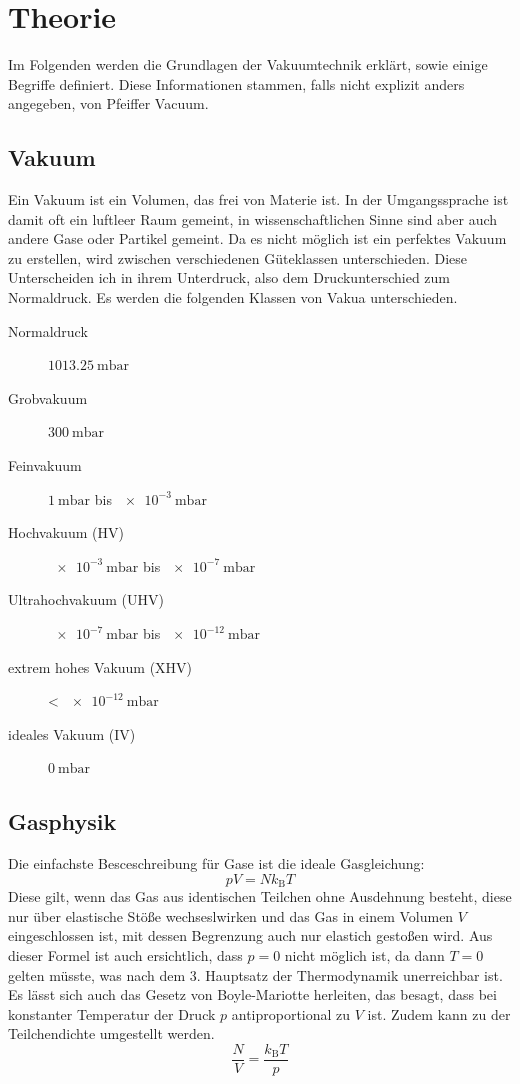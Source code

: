 \section{Theorie}
\label{sec:Theorie}
Im Folgenden werden die Grundlagen der Vakuumtechnik erklärt, sowie einige Begriffe definiert. Diese Informationen stammen, falls nicht explizit anders angegeben, von Pfeiffer Vacuum\cite{Pfeiffer}.
\subsection{Vakuum}
Ein Vakuum ist ein Volumen, das frei von Materie ist. In der Umgangssprache ist damit oft ein luftleer Raum gemeint, in wissenschaftlichen Sinne sind aber auch
andere Gase oder Partikel gemeint. Da es nicht möglich ist ein perfektes Vakuum zu erstellen, wird zwischen verschiedenen Güteklassen unterschieden. Diese
Unterscheiden ich in ihrem Unterdruck, also dem Druckunterschied zum Normaldruck. Es werden die folgenden Klassen von Vakua unterschieden.
\begin{description}
	\item[Normaldruck] $\SI{1013.25}{\milli \bar}$
	\item[Grobvakuum] $\SI{300}{\milli \bar}$
	\item[Feinvakuum] $\SI{1}{\milli \bar}$ bis $\SI{e-3}{\milli \bar}$
	\item[Hochvakuum (HV)] $\SI{e-3}{\milli \bar}$ bis $\SI{e-7}{\milli \bar}$
	\item[Ultrahochvakuum (UHV)] $\SI{e-7}{\milli \bar}$ bis $\SI{e-12}{\milli \bar}$
	\item[extrem hohes Vakuum (XHV)] < $\SI{e-12}{\milli \bar}$
	\item[ideales Vakuum (IV)] $\SI{0}{\milli \bar}$
\end{description}
\subsection{Gasphysik}
Die einfachste Besceschreibung für Gase ist die ideale Gasgleichung:
\begin{equation}
	pV=Nk_\text{B}T
\end{equation}
Diese gilt, wenn das Gas aus identischen Teilchen ohne Ausdehnung besteht, diese nur über elastische Stöße wechseslwirken und das Gas in einem Volumen $V$ eingeschlossen
ist, mit dessen Begrenzung auch nur elastich gestoßen wird. Aus dieser Formel ist auch ersichtlich, dass $p=0$ nicht möglich ist, da dann $T=0$ gelten
müsste, was nach dem 3. Hauptsatz der Thermodynamik unerreichbar ist. Es lässt sich auch das Gesetz von Boyle-Mariotte herleiten, das besagt, dass bei
 konstanter Temperatur der Druck $p$ antiproportional zu $V$ ist. Zudem kann zu der Teilchendichte umgestellt werden.\cite{TuSKierfeld}
 \begin{equation}
 	\frac{N}{V}=\frac{k_\text{B}T}{p}
 \end{equation}

